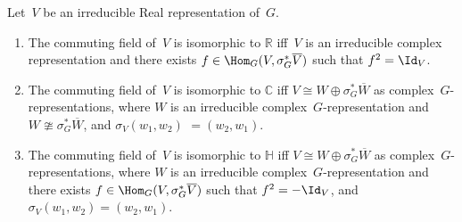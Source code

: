\begin{Proposition}
\label{realrepclassification}
Let~$V$ be an irreducible Real representation of~$G$.
\begin{enumerate}\itemsep=0pt
\item[$1.$]
The commuting field of~$V$ is isomorphic to $\mathbb{R}$ iff~$V$ is an irreducible complex representation and there
exists $f\in\Hom_G(V,
\sigma_G^*\overline{V})$ such that $f^2=\Id_V$.
\item[$2.$]
The commuting field of~$V$ is isomorphic to $\mathbb{C}$ iff $V\cong W\oplus
\sigma_G^*\overline{W}$ as complex~$G$-representa\-tions,
where $W$ is an irreducible complex~$G$-representation and $W\ncong
\sigma_G^*\overline{W}$, and $\sigma_V(w_1, w_2)$ $=(w_2, w_1)$.
\item[$3.$]
The commuting field of~$V$ is isomorphic to $\mathbb{H}$ iff $V\cong W\oplus
\sigma_G^*\overline{W}$ as complex~$G$-repre\-sen\-ta\-tions,
where $W$ is an irreducible complex~$G$-representation and there exists
$f\in\Hom_G(V,\sigma_G^*\overline{V})$ such that $f^2=-\Id_V$, and $\sigma_V(w_1, w_2)=(w_2, w_1)$.
\end{enumerate}
\end{Proposition}

